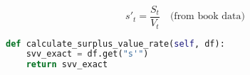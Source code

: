 \documentclass[12pt,a4paper]{article}
\begin{document}
\begin{equation*}
s'_t = \frac{S_t}{V_t} \quad \text{(from book data)}
\end{equation*}

\begin{tcolorbox}[colback=gray!5!white,colframe=gray!60!black,title=Python Implementation]
\begin{lstlisting}[language=Python]
def calculate_surplus_value_rate(self, df):
    svv_exact = df.get("s'")
    return svv_exact
\end{lstlisting}
\end{tcolorbox}
\end{document}
